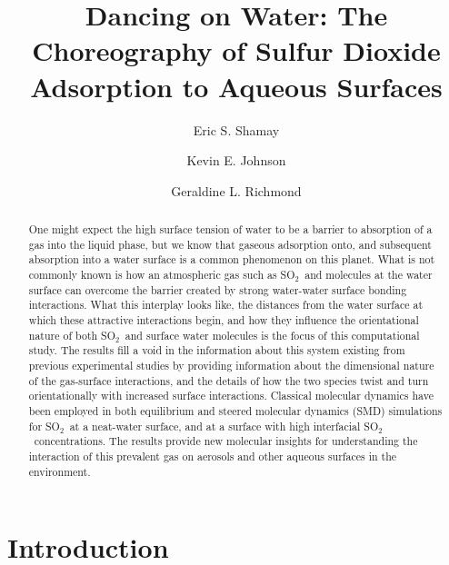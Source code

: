 \documentclass{article}
\title{Dancing on Water: The Choreography of Sulfur Dioxide Adsorption to Aqueous Surfaces}
\author{Eric S. Shamay \and Kevin E. Johnson \and Geraldine L. Richmond}
\begin{document}
\newcommand{\suldiox}{SO$_2$}
\newcommand{\ang}{\,$\textrm{\AA}$}
\newcommand{\angs}{\ang}
\newcommand{\wat}{H$_2$O}

\maketitle

\doublespacing


\begin{abstract}
One might expect the high surface tension of water to be a barrier to absorption of a gas into the liquid phase, but we know that gaseous adsorption onto, and subsequent absorption into a water surface is a common phenomenon on this planet.  What is not commonly known is how an atmospheric gas such as \suldiox~and molecules at the water surface can overcome the barrier created by strong water-water surface bonding interactions.  What this interplay looks like, the distances from the water surface at which these attractive interactions begin, and how they influence the orientational nature of both \suldiox~and surface water molecules is the focus of this computational study.  The results fill a void in the information about this system existing from previous experimental studies by providing information about the dimensional nature of the gas-surface interactions, and the details of how the two species twist and turn orientationally with increased surface interactions.  Classical molecular dynamics have been employed in both equilibrium and steered molecular dynamics (SMD) simulations for \suldiox~at a neat-water surface, and at a surface with high interfacial \suldiox~concentrations.  The results provide new molecular insights for understanding the interaction of this prevalent gas on aerosols and other aqueous surfaces in the environment.
\end{abstract}

\section{Introduction}
\end{document}
